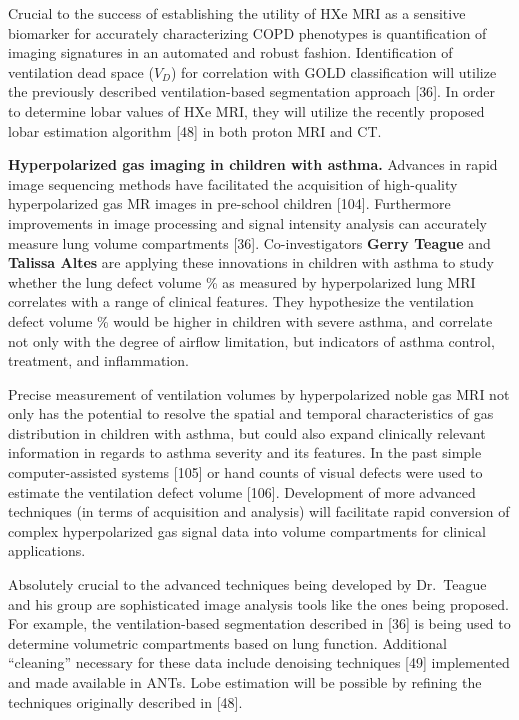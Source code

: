 \documentclass[11pt,]{article}
\begin{document}
Crucial to the success of establishing the utility of HXe MRI as a
sensitive biomarker for accurately characterizing COPD phenotypes is
quantification of imaging signatures in an automated and robust fashion.
Identification of ventilation dead space ($V_D$) for correlation with
GOLD classification will utilize the previously described
ventilation-based segmentation approach {[}36{]}. In order to determine
lobar values of HXe MRI, they will utilize the recently proposed lobar
estimation algorithm {[}48{]} in both proton MRI and CT.

\textbf{Hyperpolarized gas imaging in children with asthma.} Advances in
rapid image sequencing methods have facilitated the acquisition of
high-quality hyperpolarized gas MR images in pre-school children
{[}104{]}. Furthermore improvements in image processing and signal
intensity analysis can accurately measure lung volume compartments
{[}36{]}. Co-investigators \textbf{Gerry Teague} and \textbf{Talissa
Altes} are applying these innovations in children with asthma to study
whether the lung defect volume \% as measured by hyperpolarized lung MRI
correlates with a range of clinical features. They hypothesize the
ventilation defect volume \% would be higher in children with severe
asthma, and correlate not only with the degree of airflow limitation,
but indicators of asthma control, treatment, and inflammation.

Precise measurement of ventilation volumes by hyperpolarized noble gas
MRI not only has the potential to resolve the spatial and temporal
characteristics of gas distribution in children with asthma, but could
also expand clinically relevant information in regards to asthma
severity and its features. In the past simple computer-assisted systems
{[}105{]} or hand counts of visual defects were used to estimate the
ventilation defect volume {[}106{]}. Development of more advanced
techniques (in terms of acquisition and analysis) will facilitate rapid
conversion of complex hyperpolarized gas signal data into volume
compartments for clinical applications.

Absolutely crucial to the advanced techniques being developed by
Dr.~Teague and his group are sophisticated image analysis tools like the
ones being proposed. For example, the ventilation-based segmentation
described in {[}36{]} is being used to determine volumetric compartments
based on lung function. Additional ``cleaning'' necessary for these data
include denoising techniques {[}49{]} implemented and made available in
ANTs. Lobe estimation will be possible by refining the techniques
originally described in {[}48{]}.
\end{document}
